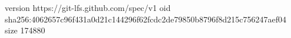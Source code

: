 version https://git-lfs.github.com/spec/v1
oid sha256:4062657c96f431a0d21c144296f62fcdc2de79850b8796f8d215c756247aef04
size 174880
